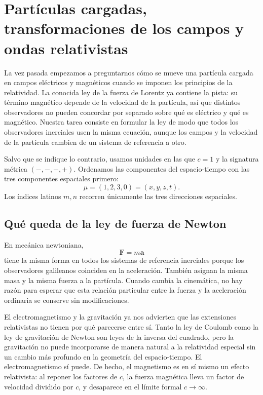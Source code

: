 \chapter{Partículas cargadas, transformaciones de los campos y ondas relativistas}

La vez pasada empezamos a preguntarnos cómo se mueve una partícula cargada en campos eléctricos y magnéticos cuando se imponen los principios de la relatividad. La conocida ley de la fuerza de Lorentz ya contiene la pista: su término magnético depende de la velocidad de la partícula, así que distintos observadores no pueden concordar por separado sobre qué es eléctrico y qué es magnético. Nuestra tarea consiste en formular la ley de modo que todos los observadores inerciales usen la misma ecuación, aunque los campos y la velocidad de la partícula cambien de un sistema de referencia a otro.

Salvo que se indique lo contrario, usamos unidades en las que \(c=1\) y la signatura métrica \((-,-,-,+)\). Ordenamos las componentes del espacio-tiempo con las tres componentes espaciales primero: \begin{equation}
  \mu=(1,2,3,0)=(x,y,z,t).
\end{equation} Los índices latinos \(m,n\) recorren únicamente las tres direcciones espaciales.

\section{Qué queda de la ley de fuerza de Newton}

En mecánica newtoniana, \begin{equation}
  \boldsymbol F=m\boldsymbol a
\end{equation} tiene la misma forma en todos los sistemas de referencia inerciales porque los observadores galileanos coinciden en la aceleración. También asignan la misma masa y la misma fuerza a la partícula. Cuando cambia la cinemática, no hay razón para esperar que esta relación particular entre la fuerza y la aceleración ordinaria se conserve sin modificaciones.

El electromagnetismo y la gravitación ya nos advierten que las extensiones relativistas no tienen por qué parecerse entre sí. Tanto la ley de Coulomb como la ley de gravitación de Newton son leyes de la inversa del cuadrado, pero la gravitación no puede incorporarse de manera natural a la relatividad especial sin un cambio más profundo en la geometría del espacio-tiempo. El electromagnetismo sí puede. De hecho, el magnetismo es en sí mismo un efecto relativista: al reponer los factores de \(c\), la fuerza magnética lleva un factor de velocidad dividido por \(c\), y desaparece en el límite formal \(c\to\infty\).

